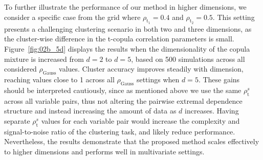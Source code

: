 \documentclass[12pt,compact]{article}
\newcommand{\rhou}[1]{\rho_{\text{#1}}}
\begin{document}
To further illustrate the performance of our method in higher dimensions, we consider a specific case from the grid where $\rho_{\text{t}_1} = 0.4$ and $\rho_{\text{t}_2} = 0.5$. 
This setting presents a challenging clustering scenario in both two and three dimensions, as the cluster-wise difference in the t-copula correlation parameters is small. 
Figure~\ref{fig:02b_5d} displays the results when the dimensionality of the copula mixture is increased from $d = 2$ to $d = 5$, based on 500 simulations across all considered $\rhou{Gauss}$ values. 
Cluster accuracy improves steadily with dimension, reaching values close to 1 across all $\rhou{Gauss}$ settings when $d = 5$. 
These gains should be interpreted cautiously, since as mentioned above we use the same $\rhou{t}^s$ across all variable pairs, thus not altering the pairwise extremal dependence structure and instead increasing the amount of data as $d$ increases.
Having separate $\rhou{t}^s$ values for each variable pair would increase the complexity and signal-to-noise ratio of the clustering task, and likely reduce performance. %
Nevertheless, the results demonstrate that the proposed method scales effectively to higher dimensions and performs well in multivariate settings. 
\end{document}
